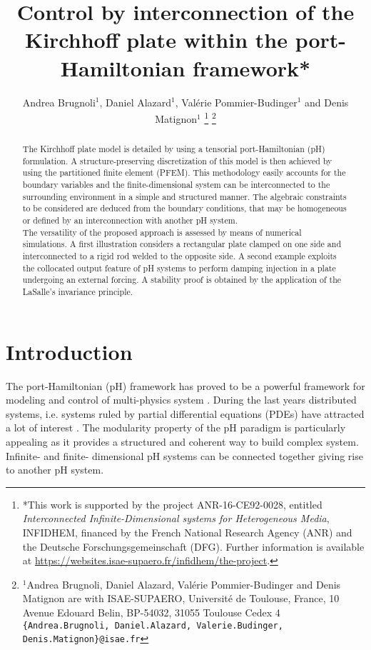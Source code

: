 \documentclass[letterpaper, 10 pt, conference]{ieeeconf}
\title{\LARGE \bf
	Control by interconnection of the Kirchhoff plate
	within the port-Hamiltonian framework*	
}
\author{Andrea Brugnoli$^{1}$, Daniel Alazard$^{1}$, Val\'erie Pommier-Budinger$^{1}$ and Denis Matignon$^{1}$%
	\thanks{*This work is supported by the project ANR-16-CE92-0028,
		entitled {\em Interconnected Infinite-Dimensional systems for Heterogeneous
			Media}, INFIDHEM, financed by the French National Research Agency (ANR) and the Deutsche Forschungsgemeinschaft (DFG). Further information is available at { \url{https://websites.isae-supaero.fr/infidhem/the-project}}.}%
	\thanks{$^{1}$Andrea Brugnoli, Daniel Alazard, Val\'erie Pommier-Budinger and Denis Matignon are with ISAE-SUPAERO, Universit\'e de Toulouse, France,
		10 Avenue Edouard Belin, BP-54032, 31055 Toulouse Cedex 4
		{\tt\small \{Andrea.Brugnoli, Daniel.Alazard, Valerie.Budinger, Denis.Matignon\}@isae.fr} }
}
\begin{document}
\maketitle
\thispagestyle{empty}
\pagestyle{empty}

\maketitle

\begin{abstract}
	The Kirchhoff plate model is detailed by using a tensorial port-Hamiltonian (pH) formulation. A structure-preserving discretization of this model is then achieved by using the partitioned finite element (PFEM). This methodology easily accounts for the boundary variables and the finite-dimensional system can be interconnected to the surrounding environment in a simple and structured manner. The algebraic constraints to be considered are deduced from the boundary conditions, that may be homogeneous or defined by an interconnection with another pH system. \\
	The versatility of the proposed approach is assessed by means of numerical simulations. A first illustration considers a rectangular plate clamped on one side and interconnected to a rigid rod welded to the opposite side. A second example exploits the collocated output feature of pH systems to perform damping injection in a plate undergoing an external forcing. A stability proof is obtained by the application of the LaSalle's invariance principle.
\end{abstract}





%
\IEEEpeerreviewmaketitle



\section{Introduction}
The port-Hamiltonian (pH) framework has proved to be a powerful framework for modeling and control of multi-physics system \cite{bookPHs}. During the last years distributed systems, i.e. systems ruled by partial differential equations (PDEs) have attracted a lot of interest \cite{BookZwart}. The modularity property of the pH paradigm is particularly appealing as it provides a structured and coherent way to build complex system. Infinite- and finite- dimensional \cite{ShaftIntInfinite, CerveraIntFinite} pH systems can be connected together giving rise to another pH system. \\
\end{document}

